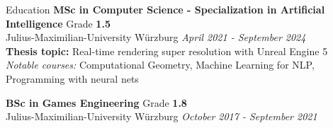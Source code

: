 \documentclass{resume} %
\begin{document}
\begin{rSection}{Education}
{\bf MSc in Computer Science - Specialization in Artificial Intelligence} \hfill {Grade \bf1.5} 
\\ Julius-Maximilian-University Würzburg \hfill {\em April 2021 - September 2024}
\\ {\small {\bf Thesis topic:} Real-time rendering super resolution with Unreal Engine 5}
\\ {\small {\em Notable courses:} Computational Geometry, Machine Learning for NLP, Programming with neural nets} 

{\bf BSc in Games Engineering} \hfill {Grade \bf 1.8} 
\\ Julius-Maximilian-University Würzburg \hfill {\em October 2017 - September 2021}

%

\end{rSection}
\end{document}
